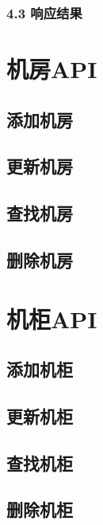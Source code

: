 \documentclass[letterpaper,10pt,english]{sphinxmanual}
\begin{document}
\subsection{4.3 响应结果}
\label{datacenter:id16}

\chapter{机房API}
\label{room:api}\label{room::doc}

\section{添加机房}
\label{room:id1}

\section{更新机房}
\label{room:id2}

\section{查找机房}
\label{room:id3}

\section{删除机房}
\label{room:id4}

\chapter{机柜API}
\label{rack:api}\label{rack::doc}

\section{添加机柜}
\label{rack:id1}

\section{更新机柜}
\label{rack:id2}

\section{查找机柜}
\label{rack:id3}

\section{删除机柜}
\label{rack:id4}
\end{document}
